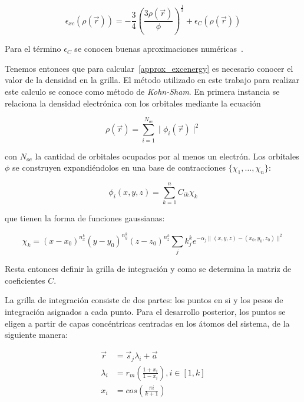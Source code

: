 \begin{equation}
    \epsilon_{xc}(\rho(\vec{r})) = -\frac{3}{4} \left (\frac{3 \rho(\vec{r})}{\phi} \right )^{\frac{1}{3}} + \epsilon_{C}(\rho(\vec{r}))
\end{equation}

Para el t\'ermino $\epsilon_{C}$ se conocen buenas aproximaciones num\'ericas~\cite{Vosko}.

Tenemos entonces que para calcular~\ref{approx_excenergy} es necesario conocer el valor de la densidad en la grilla.
El m\'etodo utilizado en este trabajo para realizar este calculo se conoce como m\'etodo de \textit{Kohn-Sham}. En primera instancia
se relaciona la densidad electr\'onica con los orbitales mediante la ecuaci\'on

\begin{equation}
    \rho(\vec{r}) = \sum_{i = 1}^{N_{oc}} \mid \phi_i(\vec{r}) \mid ^2
\end{equation}

con $N_{oc}$ la cantidad de orbitales ocupados por al menos un electr\'on. Los orbitales $\phi$ se construyen expandi\'endolos en una
base de contracciones $\{ \chi_1, \dots, \chi_n \}$:

\begin{equation}
    \phi_i(x,y,z) = \sum_{k = 1}^n C_{ik} \chi_k
\end{equation}

que tienen la forma de funciones gaussianas:

\begin{equation}
    \chi_k = (x - x_0)^{n_x^k} (y - y_0)^{n_y^k} (z - z_0)^{n_z^k} \sum_j k_j^k e^{-\alpha_j \|(x,y,z) - (x_0,y_0,z_0) \|^2 }
\end{equation}

Resta entonces definir la grilla de integraci\'on y como se determina la matriz de coeficientes $C$. 

La grilla de integraci\'on consiste de dos partes: los puntos en si y los pesos de integraci\'on asignados a cada punto. Para el 
desarrollo posterior, los puntos se eligen a partir de capas conc\'entricas centradas en los \'atomos del sistema, de la siguiente
manera:

\begin{align}
    \vec{r} & = \vec{s}_j \lambda_i + \vec{a} \\
    \lambda_i & = r_m \left ( \frac{1 + x_i}{1 - x_i} \right), i \in [1, k] \\
    x_i & = cos \left ( \frac{\pi i }{k + 1} \right )
\end{align}

